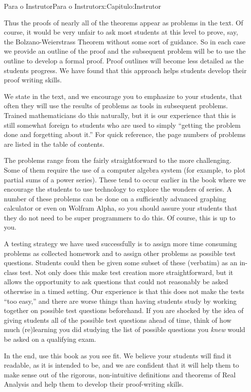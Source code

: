 \begin{chapterptx}{Para o Instrutor}{}{Para o Instrutor}{}{}{x:Capitulo:Instrutor}
	\par
	Thus the proofs of nearly all of the theorems appear as problems in the text. Of course, it would be very unfair to ask most students at this level to prove, say, the Bolzano-Weierstrass Theorem without some sort of guidance. So in each case we provide an outline of the proof and the subsequent problem will be to use the outline to develop a formal proof. Proof outlines will become less detailed as the students progress. We have found that this approach helps students develop their proof writing skills.%
	\par
	We state in the text, and we encourage you to emphasize to your students, that often they will use the results of problems as tools in subsequent problems. Trained mathematicians do this naturally, but it is our experience that this is still somewhat foreign to students who are used to simply ``getting the problem done and forgetting about it.'' For quick reference, the page numbers of problems are listed in the table of contents.%
	\par
	The problems range from the fairly straightforward to the more challenging. Some of them require the use of a computer algebra system (for example, to plot partial sums of a power series). These tend to occur earlier in the book where we encourage the students to use technology to explore the wonders of series. A number of these problems can be done on a sufficiently advanced graphing calculator or even on Wolfram Alpha, so you should assure your students that they do not need to be super programmers to do this. Of course, this is up to you.%
	\par
	A testing strategy we have used successfully is to assign more time consuming problems as collected homework and to assign other problems as possible test questions. Students could then be given some subset of these (verbatim) as an in-class test. Not only does this make test creation more straightforward, but it allows the opportunity to ask questions that could not reasonably be asked otherwise in a timed setting. Our experience is that this does not make the tests ``too easy,'' and there are worse things than having students study by working together on possible test questions beforehand. If you are shocked by the idea of giving students all of the possible test questions ahead of time, think of how much (re)learning you did studying the list of possible questions you \emph{knew} would be asked on a qualifying exam.%
	\par
	In the end, use this book as you see fit. We believe your students will find it readable, as it is intended to be, and we are confident that it will help them to make sense out of the rigorous, non-intuitive definitions and theorems of Real Analysis and help them to develop their proof-writing skills.%

\end{chapterptx}
